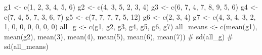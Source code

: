 \documentclass[
  letterpaper,
  DIV=11,
  numbers=noendperiod,
  oneside]{scrreprt}
\newenvironment{Shaded}{\begin{snugshade}}{\end{snugshade}}
\newcommand{\CommentTok}[1]{\textcolor[rgb]{0.37,0.37,0.37}{#1}}
\newcommand{\DecValTok}[1]{\textcolor[rgb]{0.68,0.00,0.00}{#1}}
\newcommand{\FunctionTok}[1]{\textcolor[rgb]{0.28,0.35,0.67}{#1}}
\newcommand{\NormalTok}[1]{\textcolor[rgb]{0.00,0.23,0.31}{#1}}
\newcommand{\OtherTok}[1]{\textcolor[rgb]{0.00,0.23,0.31}{#1}}
\begin{document}
\begin{Shaded}
\begin{Highlighting}[]
\NormalTok{g1 }\OtherTok{\textless{}{-}} \FunctionTok{c}\NormalTok{(}\DecValTok{1}\NormalTok{, }\DecValTok{2}\NormalTok{, }\DecValTok{3}\NormalTok{, }\DecValTok{4}\NormalTok{, }\DecValTok{5}\NormalTok{, }\DecValTok{6}\NormalTok{)}
\NormalTok{g2 }\OtherTok{\textless{}{-}} \FunctionTok{c}\NormalTok{(}\DecValTok{4}\NormalTok{, }\DecValTok{3}\NormalTok{, }\DecValTok{5}\NormalTok{, }\DecValTok{2}\NormalTok{, }\DecValTok{3}\NormalTok{, }\DecValTok{4}\NormalTok{)}
\NormalTok{g3 }\OtherTok{\textless{}{-}} \FunctionTok{c}\NormalTok{(}\DecValTok{6}\NormalTok{, }\DecValTok{7}\NormalTok{, }\DecValTok{4}\NormalTok{, }\DecValTok{7}\NormalTok{, }\DecValTok{8}\NormalTok{, }\DecValTok{9}\NormalTok{, }\DecValTok{5}\NormalTok{, }\DecValTok{6}\NormalTok{)}
\NormalTok{g4 }\OtherTok{\textless{}{-}} \FunctionTok{c}\NormalTok{(}\DecValTok{7}\NormalTok{, }\DecValTok{4}\NormalTok{, }\DecValTok{5}\NormalTok{, }\DecValTok{7}\NormalTok{, }\DecValTok{3}\NormalTok{, }\DecValTok{6}\NormalTok{, }\DecValTok{7}\NormalTok{)}
\NormalTok{g5 }\OtherTok{\textless{}{-}} \FunctionTok{c}\NormalTok{(}\DecValTok{7}\NormalTok{, }\DecValTok{7}\NormalTok{, }\DecValTok{7}\NormalTok{, }\DecValTok{7}\NormalTok{, }\DecValTok{5}\NormalTok{, }\DecValTok{12}\NormalTok{)}
\NormalTok{g6 }\OtherTok{\textless{}{-}} \FunctionTok{c}\NormalTok{(}\DecValTok{2}\NormalTok{, }\DecValTok{3}\NormalTok{, }\DecValTok{4}\NormalTok{)}
\NormalTok{g7 }\OtherTok{\textless{}{-}} \FunctionTok{c}\NormalTok{(}\DecValTok{4}\NormalTok{, }\DecValTok{3}\NormalTok{, }\DecValTok{4}\NormalTok{, }\DecValTok{3}\NormalTok{, }\DecValTok{2}\NormalTok{, }\DecValTok{1}\NormalTok{, }\DecValTok{0}\NormalTok{, }\DecValTok{0}\NormalTok{, }\DecValTok{0}\NormalTok{, }\DecValTok{0}\NormalTok{, }\DecValTok{0}\NormalTok{, }\DecValTok{0}\NormalTok{)}
\NormalTok{all\_g }\OtherTok{\textless{}{-}} \FunctionTok{c}\NormalTok{(g1, g2, g3, g4, g5, g6, g7)}
\NormalTok{all\_means }\OtherTok{\textless{}{-}} \FunctionTok{c}\NormalTok{(}\FunctionTok{mean}\NormalTok{(g1), }\FunctionTok{mean}\NormalTok{(g2), }\FunctionTok{mean}\NormalTok{(}\DecValTok{3}\NormalTok{), }\FunctionTok{mean}\NormalTok{(}\DecValTok{4}\NormalTok{), }\FunctionTok{mean}\NormalTok{(}\DecValTok{5}\NormalTok{), }\FunctionTok{mean}\NormalTok{(}\DecValTok{6}\NormalTok{), }\FunctionTok{mean}\NormalTok{(}\DecValTok{7}\NormalTok{))}
\CommentTok{\# sd(all\_g)}
\CommentTok{\# sd(all\_means)}
\end{Highlighting}
\end{Shaded}
\end{document}
